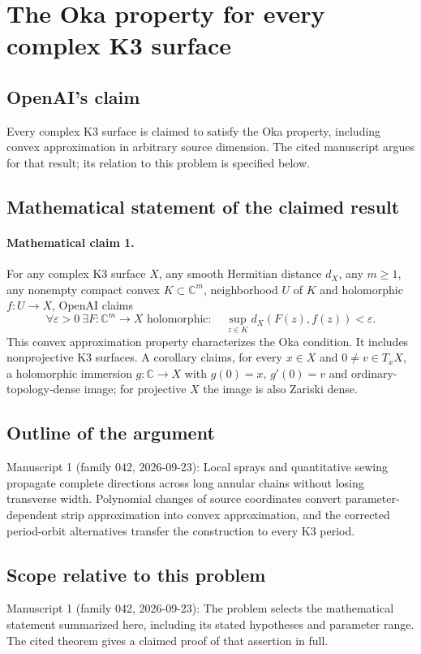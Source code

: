 \documentclass[11pt]{article}
\begin{document}
\section*{The Oka property for every complex K3 surface}

\subsection{OpenAI's claim}
Every complex K3 surface is claimed to satisfy the Oka property, including convex approximation in arbitrary source dimension. The cited manuscript argues for that result; its relation to this problem is specified below.

\subsection{Mathematical statement of the claimed result}
\paragraph{Mathematical claim 1.} For any complex K3 surface $X$, any smooth Hermitian distance $d_X$, any $m\ge1$, any nonempty compact convex $K\subset\mathbb C^m$, neighborhood $U$ of $K$ and holomorphic $f:U\to X$, OpenAI claims
\[
\forall\varepsilon>0\ \exists F:\mathbb C^m\to X\text{ holomorphic}:\quad\sup_{z\in K}d_X(F(z),f(z))<\varepsilon.
\]
This convex approximation property characterizes the Oka condition. It includes nonprojective K3 surfaces. A corollary claims, for every $x\in X$ and $0\ne v\in T_xX$, a holomorphic immersion $g:\mathbb C\to X$ with $g(0)=x$, $g'(0)=v$ and ordinary-topology-dense image; for projective $X$ the image is also Zariski dense.

\subsection{Outline of the argument}
Manuscript 1 (family 042, 2026-09-23): Local sprays and quantitative sewing propagate complete directions across long annular chains without losing transverse width. Polynomial changes of source coordinates convert parameter-dependent strip approximation into convex approximation, and the corrected period-orbit alternatives transfer the construction to every K3 period.

\subsection{Scope relative to this problem}
Manuscript 1 (family 042, 2026-09-23): The problem selects the mathematical statement summarized here, including its stated hypotheses and parameter range. The cited theorem gives a claimed proof of that assertion in full.
\end{document}
